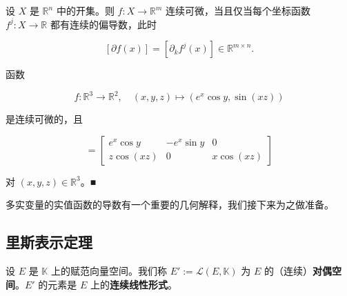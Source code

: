 \begin{corollary}

设 $ X $ 是 $ \mathbb{R}^n $ 中的开集。则 $ f : X \to \mathbb{R}^m $ 连续可微，当且仅当每个坐标函数 $ f^j : X \to \mathbb{R} $ 都有连续的偏导数，此时

\[
[\partial f(x)] = [\partial_k f^j(x)] \in \mathbb{R}^{m \times n} .
\]
\end{corollary}

\begin{example}

函数

\[
f : \mathbb{R}^3 \to \mathbb{R}^2 , \quad (x,y,z) \mapsto (e^x \cos y, \sin(xz))
\]

是连续可微的，且

\begin{equation*}
[\partial f(x,y,z)] = \begin{bmatrix} e^x \cos y & -e^x \sin y & 0 \\ z \cos(xz) & 0 & x \cos(xz) \end{bmatrix}
\end{equation*}

对 $ (x,y,z) \in \mathbb{R}^3 $。\nobreak\hspace{0.35em}■

多实变量的实值函数的导数有一个重要的几何解释，我们接下来为之做准备。

\end{example}

\subsection*{里斯表示定理}

设 $ E $ 是 $ \mathbb{K} $ 上的赋范向量空间。我们称 $ E' := \mathcal{L}(E, \mathbb{K}) $ 为 $ E $ 的（连续）\textbf{对偶空间}。$ E' $ 的元素是 $ E $ 上的\textbf{连续线性形式}。

